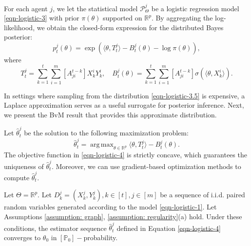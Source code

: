 \documentclass[twoside,11pt]{article}
\numberwithin{equation}{section}
\newcommand{\R}{{\mathbb{R}}}
\renewcommand\P{\mathcal{P}}
\newcommand\bP{\mathbb{P}}
\DeclareMathOperator*{\argmax}{arg\,max}
\begin{document}
{For each agent $j$, we let the statistical model $\P_\Theta^j$ be a logistic regression model \eqref{eqn-logistic-3} with prior $\pi(\theta)$ supported on $\R^p$.   By aggregating the log-likelihood, we obtain the closed-form expression for the distributed Bayes posterior: 
\begin{equation} \label{eqn-logistic-3.5}
   p_t^j (\theta) = \exp\left(\langle \theta, T_t^j \rangle - B_t^j(\theta) - \log \pi(\theta)\right), 
\end{equation}
where 
\begin{equation*}
    T_t^j =   \sum_{k = 1}^t \sum_{i = 1}^m [A^{t-k}_{ji}] X_k^i Y_k^i,  \quad B_t^j(\theta) =  \sum_{k = 1}^t \sum_{i = 1}^m [A^{t-k}_{ji}] \sigma(\langle \theta,  X_k^i \rangle). 
\end{equation*}

In settings where sampling from the distribution \eqref{eqn-logistic-3.5} is expensive, a Laplace approximation serves as a useful surrogate for posterior inference. Next, we present the BvM result that provides this approximate distribution.



Let $\hat \theta_t^j$ be the solution to the following maximization problem: 
\begin{equation}\label{eqn-logistic-4}
    \hat \theta_t^j = \argmax_{\theta \in \R^p}\langle \theta, T_t^j \rangle - B_t^j(\theta). 
\end{equation}
The objective function in \eqref{eqn-logistic-4} is strictly concave, which guarantees the uniqueness of $\hat{\theta}_t^j$. Moreover, we can use gradient-based optimization methods to compute $\hat{\theta}_t^j$.

\begin{proposition}\label{prop:logistic-1}
Let $\Theta = \R^p$.  Let $D_k^j = (X_k^j, Y_k^j), k \in [t], j \in [m]$ be a sequence of i.i.d. paired random variables generated according to the model \eqref{eqn-logistic-1}. Let Assumptions \ref{assumption: graph}, \ref{assumption: regularity}(a) hold.  Under these conditions, the estimator sequence $\hat{\theta}_t^j$ defined in Equation \eqref{eqn-logistic-4} converges to $\theta_0$ in $[\bP_0]-$probability.


\end{proposition}}
\end{document}
